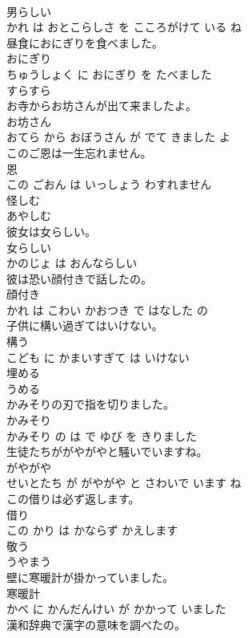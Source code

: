 \documentclass[8pt]{extreport}
\begin{document}
\begin{CJK}{UTF8}{min}
\\	男らしい 
\\	かれ は おとこらしさ を こころがけて いる ね			
\\	昼食におにぎりを食べました。	
\\	おにぎり 
\\	ちゅうしょく に おにぎり を たべました			
\\	すらすら	
\\	お寺からお坊さんが出て来ましたよ。	
\\	お坊さん 
\\	おてら から おぼうさん が でて きました よ			
\\	このご恩は一生忘れません。	
\\	恩 
\\	この ごおん は いっしょう わすれません			
\\	怪しむ	
\\	あやしむ			
\\	彼女は女らしい。	
\\	女らしい 
\\	かのじょ は おんならしい			
\\	彼は恐い顔付きで話したの。	
\\	顔付き 
\\	かれ は こわい かおつき で はなした の			
\\	子供に構い過ぎてはいけない。	
\\	構う 
\\	こども に かまいすぎて は いけない			
\\	埋める	
\\	うめる			
\\	かみそりの刃で指を切りました。	
\\	かみそり 
\\	かみそり の は で ゆび を きりました			
\\	生徒たちががやがやと騒いでいますね。	
\\	がやがや 
\\	せいとたち が がやがや と さわいで います ね			
\\	この借りは必ず返します。	
\\	借り 
\\	この かり は かならず かえします			
\\	敬う	
\\	うやまう			
\\	壁に寒暖計が掛かっていました。	
\\	寒暖計 
\\	かべ に かんだんけい が かかって いました			
\\	漢和辞典で漢字の意味を調べたの。	

\end{CJK}
\end{document}
